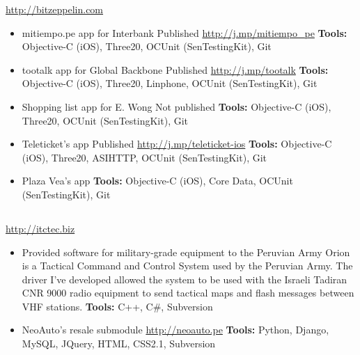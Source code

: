 \documentclass[11pt,a4paper,english]{moderncv}
\begin{document}
{
\url{http://bitzeppelin.com}
\newline{}
\begin{itemize}
    \item mitiempo.pe app for Interbank
        \newline{}
        Published \url{http://j.mp/mitiempo_pe}
        \newline{}
        \textbf{Tools:} Objective-C (iOS), Three20, OCUnit (SenTestingKit), Git
    \item tootalk app for Global Backbone
        \newline{}
        Published \url{http://j.mp/tootalk}
        \newline{}
        \textbf{Tools:} Objective-C (iOS), Three20, Linphone, OCUnit (SenTestingKit), Git
    \item Shopping list app for E. Wong
        \newline{}
        Not published
        \newline{}
        \textbf{Tools:} Objective-C (iOS), Three20, OCUnit (SenTestingKit), Git
    \item Teleticket's app
        \newline{}
        Published \url{http://j.mp/teleticket-ios}
        \newline{}
        \textbf{Tools:} Objective-C (iOS), Three20, ASIHTTP, OCUnit (SenTestingKit), Git
    \item Plaza Vea's app
        \newline{}
        \textbf{Tools:} Objective-C (iOS), Core Data, OCUnit (SenTestingKit), Git
\end{itemize}
}

\subsection{}

{
\url{http://itctec.biz}
\newline{}
\begin{itemize}
    \item Provided software for military-grade equipment to the Peruvian Army
        \newline{}
        Orion is a Tactical Command and Control System used by the Peruvian Army. The driver I've developed allowed the system to be used with the Israeli Tadiran CNR 9000 radio equipment to send tactical maps and flash messages between VHF stations.
        \newline{}
        \textbf{Tools:} C++, C\#, Subversion
    \item NeoAuto's resale submodule
        \newline{}
        \url{http://neoauto.pe}
        \newline{}
        \textbf{Tools:} Python, Django, MySQL, JQuery, HTML, CSS2.1, Subversion
\end{itemize}
}
\end{document}
